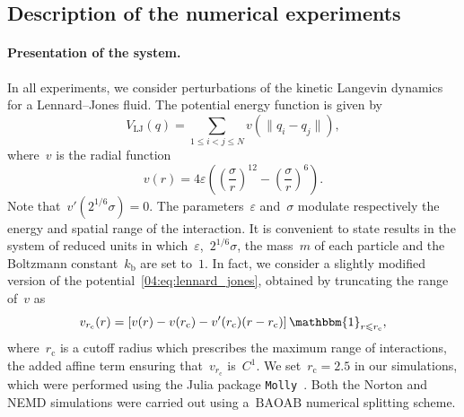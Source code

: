 \subsection{Description of the numerical experiments}\label{04:subsec:numerical_system}
\paragraph{Presentation of the system.}
In all experiments, we consider perturbations of the kinetic Langevin dynamics for a Lennard--Jones fluid. The potential energy function is given by
\begin{equation}
        \label{04:eq:lennard_jones}
        V_{\mathrm{LJ}}(q)=\sum_{1\leq i < j \leq N} v\left(\|q_i-q_j\|\right),        
    \end{equation}
    where~$v$ is the radial function
   ~$$v(r)=4\varepsilon \left( \left( \frac{\sigma}{r}\right)^{12}-\left(\frac{\sigma}{r} \right)^6\right).$$
   Note that~$v'(2^{1/6}\sigma)=0$.
   The parameters~$\varepsilon$ and~$\sigma$ modulate respectively the energy and spatial range of the interaction. It is convenient to state results in the system of reduced units in which~$\varepsilon$,~$2^{1/6}\sigma$, the mass~$m$ of each particle and the Boltzmann constant~$k_{\mathrm{b}}$ are set to~$1$.  In fact, we consider a slightly modified version of the potential~\eqref{04:eq:lennard_jones}, obtained by truncating the range of~$v$ as
    \[v_{r_{\mathrm{c}}}(r)=\left[v(r)-v(r_{\mathrm c}) -v'(r_{\mathrm c})(r-r_{\mathrm c})\right]\mathbbm{1}_{r\leq r_{\mathrm{c}}},\]
   where~$r_{\mathrm c}$ is a cutoff radius which prescribes the maximum range of interactions, the added affine term ensuring that~$v_{r_{\mathrm{c}}}$ is~$C^1$.
   We set~$r_{\mathrm c} = 2.5$ in our simulations, which were performed using the Julia package {\tt Molly}~\cite{molly}. Both the Norton and NEMD simulations were carried out using a~$\mathrm{BAOAB}$ numerical splitting scheme.
   
